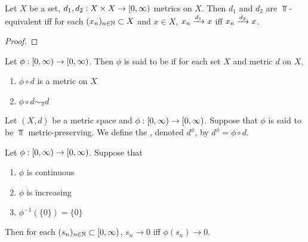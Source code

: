 \documentclass{book}
\begin{document}
\begin{ex} 
	Let $X$ be a set, $d_1, d_2: X \times X \rightarrow [0,\infty)$ metrics on $X$. Then $d_1$ and $d_2$ are $\Top$-equivalent iff for each $(x_n)_{n \in \mathbb{N}} \subset X$ and $x \in X$, $x_n \xrightarrow{d_1} x$ iff $x_n \xrightarrow{d_2} x$.	
\end{ex}

\begin{proof}
\end{proof}

\begin{defn} 
	Let $\phi: [0,\infty) \rightarrow [0,\infty)$. Then $\phi$ is said to be  if for each set $X$ and metric $d$ on $X$, 
	\begin{enumerate}
		\item $\phi \circ d$ is a metric on $X$
		\item $\phi \circ d \sim_{\Top} d$
	\end{enumerate} 
\end{defn}

\begin{defn} 
	Let $(X, d)$ be a metric space and $\phi: [0,\infty) \rightarrow [0,\infty)$. Suppose that $\phi$ is said to be $\Top$ metric-preserving. We define the , denoted $d^{\phi}$, by $d^{\phi} = \phi \circ d$.  
\end{defn}

\begin{ex} 
	Let $\phi: [0,\infty) \rightarrow [0,\infty)$. Suppose that  
	\begin{enumerate}
		\item $\phi$ is continuous
		\item $\phi$ is increasing
		\item $\phi^{-1}(\{0\}) = \{0\}$ 
	\end{enumerate}
	Then for each $(s_n)_{n \in \mathbb{N}} \subset [0,\infty)$, $s_n \rightarrow 0$ iff $\phi(s_n) \rightarrow 0$. 
\end{ex}
\end{document}
